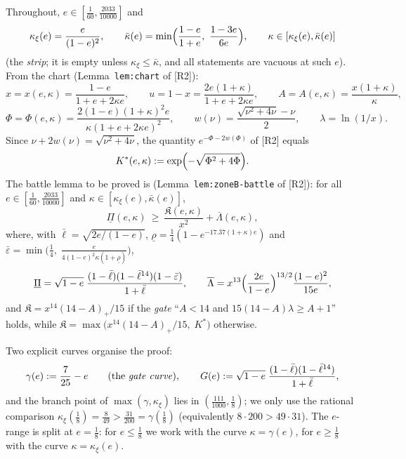 \documentclass[11pt]{article}
\theoremstyle{remark}
\newcommand{\eps}{\varepsilon}
\newcommand{\Kfrak}{\mathfrak K}
\newcommand{\Kstar}{K^{*}}
\newcommand{\kxi}{\kappa_\xi}
\newcommand{\kbar}{\bar\kappa}
\newcommand{\lbar}{\bar\ell}
\newcommand{\epsbar}{\bar\eps}
\newcommand{\RII}{[R2]}
\begin{document}
Throughout, $e\in[\tfrac1{60},\tfrac{2033}{10000}]$ and
\[
        \kxi(e)=\frac e{(1-e)^2},\qquad
        \kbar(e)=\min\Bigl(\frac{1-e}{1+e},\ \frac{1-3e}{6e}\Bigr),\qquad
        \kappa\in[\kxi(e),\kbar(e)]
\]
(the \emph{strip}; it is empty unless $\kxi\le\kbar$, and all statements are
vacuous at such $e$).  From the chart (Lemma~\texttt{lem:chart} of \RII):
\[
        x=x(e,\kappa)=\frac{1-e}{1+e+2\kappa e},\qquad
        u=1-x=\frac{2e(1+\kappa)}{1+e+2\kappa e},\qquad
        A=A(e,\kappa)=\frac{x(1+\kappa)}\kappa ,
\]
\[
        \Phi=\Phi(e,\kappa)=\frac{2(1-e)(1+\kappa)^2e}{\kappa(1+e+2\kappa e)^2},
        \qquad
        w(\nu)=\frac{\sqrt{\nu^2+4\nu}-\nu}2 ,
        \qquad
        \lambda=\ln(1/x).
\]
Since $\nu+2w(\nu)=\sqrt{\nu^2+4\nu}$, the quantity
$e^{-\Phi-2w(\Phi)}$ of \RII{} equals
\begin{equation}\label{eq:Kstar-def}
        \Kstar(e,\kappa):=\exp\Bigl(-\sqrt{\Phi^2+4\Phi}\Bigr).
\end{equation}
The battle lemma to be proved is
(Lemma~\texttt{lem:zoneB-battle} of \RII):
for all $e\in[\tfrac1{60},\tfrac{2033}{10000}]$ and
$\kappa\in[\kxi(e),\kbar(e)]$,
\begin{equation}\label{eq:battle}
        \underline\Pi(e,\kappa)\ \ge\
        \frac{\Kfrak(e,\kappa)}{x^2}+\overline\Lambda(e,\kappa),
\end{equation}
where, with $\lbar=\sqrt{2e/(1-e)}$,
$\underline\rho=\tfrac14(1-e^{-17.37(1+\kappa)e})$ and
$\epsbar=\min\bigl(\tfrac14,\;\frac e{4(1-e)^2\kappa(1+\underline\rho)}\bigr)$,
\[
        \underline\Pi
        =\sqrt{1-e}\;\frac{(1-\lbar)(1-\lbar^{14})(1-\epsbar)}{1+\lbar},
        \qquad
        \overline\Lambda
        =x^{13}\Bigl(\frac{2e}{1-e}\Bigr)^{13/2}\frac{(1-e)^2}{15e},
\]
and $\Kfrak=x^{14}(14-A)_+/15$ if the \emph{gate}
``$A<14$ and $15(14-A)\lambda\ge A+1$'' holds, while
$\Kfrak=\max\bigl(x^{14}(14-A)_+/15,\;\Kstar\bigr)$ otherwise.

Two explicit curves organise the proof:
\[
        \gamma(e):=\frac7{25}-e
        \qquad\text{(the \emph{gate curve})},
        \qquad
        G(e):=\sqrt{1-e}\;\frac{(1-\lbar)(1-\lbar^{14})}{1+\lbar},
\]
and the branch point of $\max(\gamma,\kxi)$ lies in
$(\tfrac{111}{1000},\tfrac18)$; we only use the rational comparison
$\kxi(\tfrac18)=\tfrac8{49}>\tfrac{31}{200}=\gamma(\tfrac18)$
(equivalently $8\cdot200>49\cdot31$).
The $e$-range is split at $e=\tfrac18$: for $e\le\tfrac18$ we work with the
curve $\kappa=\gamma(e)$, for $e\ge\tfrac18$ with the curve
$\kappa=\kxi(e)$.
\end{document}
